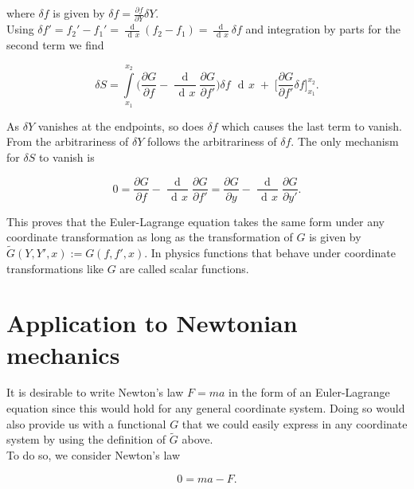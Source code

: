 \documentclass{article}
\DeclareMathOperator{\dd}{\!d\!}
\begin{document}
where $\delta f$ is given by $\delta f = \frac{\partial f}{\partial Y} \delta Y$. \\


Using $\delta f' = f_2' - f_1' = \frac{\dd}{\dd x}(f_2 - f_1) = \frac{\dd}{\dd x} \delta f$ and integration by parts for the second term we find


\begin{equation}
\delta S = \int\limits_{x_1}^{x_2} \bigg( \frac{\partial G}{\partial f} 
- \frac{\dd}{\dd x} \frac{\partial G}{\partial f'} \bigg) \delta f \; \dd x \;
+ \; \bigg[\frac{\partial G}{\partial f'} \delta f \bigg]_{x_1}^{x_2}.
\end{equation}


As $\delta Y$ vanishes at the endpoints, so does $\delta f$ which causes the last term to vanish. From the arbitrariness of $\delta Y$ follows the arbitrariness of $\delta f$. The only mechanism for $\delta S$ to vanish is

\begin{equation}
0 = \frac{\partial G}{\partial f} - \frac{\dd}{\dd x} \frac{\partial G}{\partial f'} 
= \frac{\partial G}{\partial y} - \frac{\dd}{\dd x} \frac{\partial G}{\partial y'}.
\end{equation}

This proves that the Euler-Lagrange equation takes the same form under any coordinate transformation as long as the transformation of $G$ is given by $\widetilde{G}(Y,Y',x) := G(f,f',x)$. In physics functions that behave under coordinate transformations like $G$ are called scalar functions. %

\section{Application to Newtonian mechanics \cite{Guthrie}} %


It is desirable to write Newton's law $F=ma$ in the form of an Euler-Lagrange equation since this would hold for any general coordinate system. Doing so would also provide us with a functional $G$ that we could easily express in any coordinate system by using the definition of $\widetilde{G}$ above.\\

To do so, we consider Newton's law

\begin{equation}
0 = ma - F. %
\end{equation}
\end{document}
